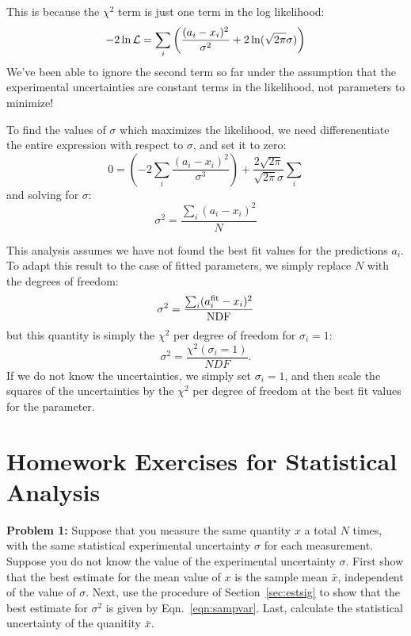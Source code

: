 \documentclass[12pt,oneside]{book}
\begin{document}
This is because the $\chi^2$ term is just one term in the log likelihood:
\begin{equation*}
-2 \ln {\cal L} = \sum_i \left( \frac{(a_i-x_i)^2}{\sigma^2} + 2 \ln(\sqrt{2\pi}\sigma)\right)
\end{equation*}
We've been able to ignore the second term so far under the assumption
that the experimental uncertainties are constant terms in the
likelihood, not parameters to minimize!

To find the values of $\sigma$ which maximizes the likelihood, we need differenentiate the entire expression with respect to $\sigma$, and set it to zero:
\begin{equation*}
0 = \left( - 2 \sum_i \frac{(a_i-x_i)^2}{\sigma^3} \right)+\frac{2\sqrt{2\pi}}{\sqrt{2\pi}\sigma}\sum_i 
\end{equation*}
and solving for $\sigma$:
\begin{equation}
\sigma^2 = \frac{\sum_i (a_i-x_i)^2}{N} 
\end{equation}

This analysis assumes we have not found the best fit values for the
predictions $a_i$.  To adapt this result to the case of fitted
parameters, we simply replace $N$ with the degrees of freedom:
\begin{displaymath}
\sigma^2 = \frac{\sum_i (a_i^{\rm fit}-x_i)^2}{\rm NDF}
\end{displaymath}
but this quantity is simply the $\chi^2$ per degree of freedom for $\sigma_i = 1$:
\begin{displaymath}
\sigma^2 = \frac{\chi^2(\sigma_i = 1)}{NDF}.
\end{displaymath}
If we do not know the uncertainties, we simply set $\sigma_i = 1$, and
then scale the squares of the uncertainties by the $\chi^2$ per
degree of freedom at the best fit values for the parameter.

\newpage

\section{Homework Exercises for Statistical Analysis}

\noindent
{\bf Problem 1:} Suppose that you measure the same quantity $x$ a
total $N$ times, with the same statistical experimental uncertainty
$\sigma$ for each measurement.  Suppose you do not know the value of
the experimental uncertainty $\sigma$.  First show that the best
estimate for the mean value of $x$ is the sample mean $\bar{x}$,
independent of the value of $\sigma$.  Next, use the procedure of
Section~\ref{sec:estsig} to show that the best estimate for $\sigma^2$
is given by Eqn.~\ref{eqn:sampvar}.  Last, calculate the statistical
uncertainty of the quanitity $\bar{x}$.
\end{document}
